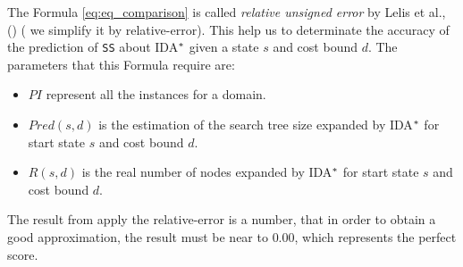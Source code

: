 The Formula \ref{eq:eq_comparison} is called \textit{relative unsigned error} by Lelis et al., (\citeyear{lelis2012fast}) ( we simplify it by relative-error). This help us to determinate the accuracy of the prediction of \texttt{SS} about IDA$\sp{*}$ given a state $s$ and cost bound $d$. The parameters that this Formula require are:
\begin{itemize}
  \item $PI$ represent all the instances for a domain.
  \item $Pred(s,d)$ is the estimation of the search tree size expanded by IDA$\sp{*}$ for start state $s$ and cost bound $d$.
  \item $R(s,d)$ is the real number of nodes expanded by IDA$\sp{*}$ for start state $s$ and cost bound $d$.
\end{itemize}
The result from apply the relative-error is a number, that in order to obtain a good approximation, the result must be near to $0.00$, which represents the perfect score.

